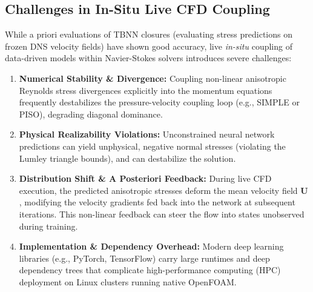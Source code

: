 \documentclass[11pt,a4paper]{article}
\begin{document}
\subsection{Challenges in In-Situ Live CFD Coupling}
While a priori evaluations of TBNN closures (evaluating stress predictions on frozen DNS velocity fields) have shown good accuracy, live \textit{in-situ} coupling of data-driven models within Navier-Stokes solvers introduces severe challenges:
\begin{enumerate}
    \item \textbf{Numerical Stability \& Divergence:} Coupling non-linear anisotropic Reynolds stress divergences explicitly into the momentum equations frequently destabilizes the pressure-velocity coupling loop (e.g., SIMPLE or PISO), degrading diagonal dominance.
    \item \textbf{Physical Realizability Violations:} Unconstrained neural network predictions can yield unphysical, negative normal stresses (violating the Lumley triangle bounds), and can destabilize the solution.
    \item \textbf{Distribution Shift \& A Posteriori Feedback:} During live CFD execution, the predicted anisotropic stresses deform the mean velocity field $\mathbf{U}$, modifying the velocity gradients fed back into the network at subsequent iterations. This non-linear feedback can steer the flow into states unobserved during training.
    \item \textbf{Implementation \& Dependency Overhead:} Modern deep learning libraries (e.g., PyTorch, TensorFlow) carry large runtimes and deep dependency trees that complicate high-performance computing (HPC) deployment on Linux clusters running native OpenFOAM.
\end{enumerate}
\end{document}
